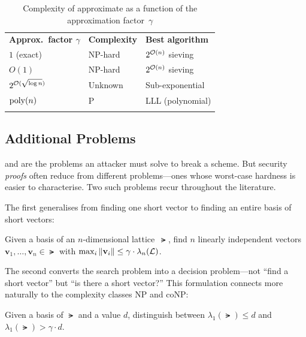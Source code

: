 \begin{table}[t]
\caption{Complexity of approximate \svp{} as a function of the approximation factor~$\gamma$}
\label{tab:approx-hardness}
\begin{tabular}{p{4cm}p{3cm}p{4cm}}
\hline\noalign{\smallskip}
\textbf{Approx.\ factor $\gamma$} & \textbf{Complexity} & \textbf{Best algorithm} \\
\noalign{\smallskip}\svhline\noalign{\smallskip}
$1$ (exact) & NP-hard & $2^{\mathcal{O}(n)}$ sieving \\
$O(1)$ & NP-hard & $2^{\mathcal{O}(n)}$ sieving \\
$2^{\mathcal{O}(\sqrt{\log n})}$ & Unknown & Sub-exponential \\
$\operatorname{poly}(n)$ & P & LLL (polynomial) \\
\noalign{\smallskip}\hline
\end{tabular}
\end{table}


\subsection{Additional Problems}
\label{subsec:additional-problems}

\svp{} and \cvp{} are the problems an attacker must solve to break a scheme.  But security \emph{proofs} often reduce from different problems---ones whose worst-case hardness is easier to characterise.  Two such problems recur throughout the literature.

The first generalises \svp{} from finding one short vector to finding an entire basis of short vectors:

\begin{definition}
\label{def:sivp}
Given a basis of an $n$-dimensional lattice~$\lat$, find $n$ linearly independent vectors $\mathbf{v}_1,\ldots,\mathbf{v}_n \in \lat$ with $\max_i \left\lVert \mathbf{v}_i \right\rVert \leq \gamma\cdot\lambda_n(\mathcal{L})$.
\end{definition}

The second converts the search problem into a decision problem---not ``find a short vector'' but ``is there a short vector?''  This formulation connects more naturally to the complexity classes NP and coNP:

\begin{definition}
\label{def:gapsvp}
Given a basis of $\lat$ and a value $d$, distinguish between $\lambda_1(\lat)\leq d$ and $\lambda_1(\lat) > \gamma\cdot d$.
\end{definition}

